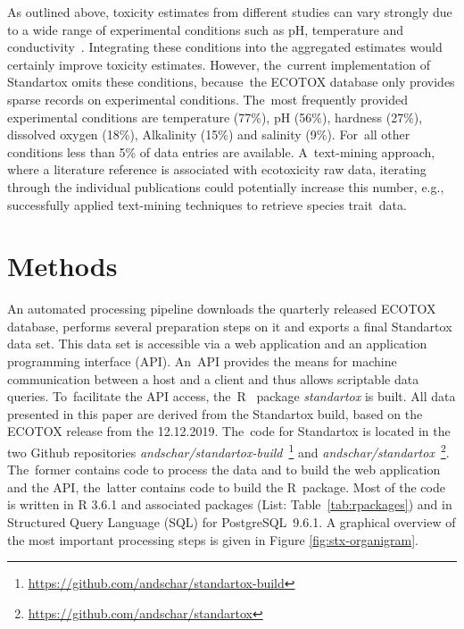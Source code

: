 \documentclass[data,datadescriptor,accept,moreauthors,pdftex]{Definitions/mdpi}
\begin{document}
\par
As outlined above, toxicity estimates from different studies can vary strongly due to a wide range of experimental conditions such as pH, temperature and conductivity~\citep{rosenkrantz_influence_2013, li_temperature_2011}. Integrating these conditions into the aggregated estimates would certainly improve toxicity estimates. However, the~current implementation of Standartox omits these conditions, because~the ECOTOX database only provides sparse records on experimental conditions. The~most frequently provided experimental conditions are temperature (77\%), pH (56\%), hardness (27\%), dissolved oxygen (18\%), Alkalinity (15\%) and salinity (9\%). For~all other conditions less than 5\% of data entries are available. A~text-mining approach, where a literature reference is associated with ecotoxicity raw data, iterating through the individual publications could potentially increase this number, e.g.,~\citet{compson_linking_2018} successfully applied text-mining techniques to retrieve species trait~data. 

\section{Methods}
An automated processing pipeline downloads the quarterly released ECOTOX database, performs several preparation steps on it and exports a final Standartox data set. This data set is accessible via a web application and an application programming interface (API). An~API provides the means for machine communication between a host and a client and thus allows scriptable data queries. To~facilitate the API access, the~R~\citep{rcoreteam_language_2020} package \textit{standartox} is built. All data presented in this paper are derived from the Standartox build, based on the ECOTOX release from the 12.12.2019. The~code for Standartox is located in the two Github repositories \textit{andschar/standartox-build}~\footnote{\url{https://github.com/andschar/standartox-build}} and \textit{andschar/standartox}~\footnote{\url{https://github.com/andschar/standartox}}. The~former contains code to process the data and to build the web application and the API, the~latter contains code to build the R~package. Most of the code is written in R 3.6.1 and associated packages (List: Table~\ref{tab:rpackages}) and in Structured Query Language (SQL) for PostgreSQL~9.6.1. A graphical overview of the most important processing steps is given in Figure \ref{fig:stx-organigram}. %
\end{document}
